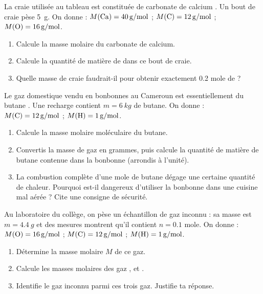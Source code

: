 \documentclass[11pt]{article}
\begin{document}
\begin{exercice}
La craie utilisée au tableau est constituée de carbonate de calcium . Un bout de craie pèse \SI{5}{g}.
On donne : $M(\ce{Ca}) = \SI{40}{g/mol}$ ; $M(\ce{C}) = \SI{12}{g/mol}$ ; $M(\ce{O}) = \SI{16}{g/mol}$.
\begin{enumerate}
\item Calcule la masse molaire du carbonate de calcium.
\item Calcule la quantité de matière de  dans ce bout de craie.
\item Quelle masse de craie faudrait-il pour obtenir exactement \num{0,2} mole de  ?
\end{enumerate}
\end{exercice}

\begin{exercice}
Le gaz domestique vendu en bonbonnes au Cameroun est essentiellement du butane . Une recharge contient $m = \SI{6}{kg}$ de butane.
On donne : $M(\ce{C}) = \SI{12}{g/mol}$ ; $M(\ce{H}) = \SI{1}{g/mol}$.
\begin{enumerate}
\item Calcule la masse molaire moléculaire du butane.
\item Convertis la masse de gaz en grammes, puis calcule la quantité de matière de butane contenue dans la bonbonne (arrondis à l'unité).
\item La combustion complète d'une mole de butane dégage une certaine quantité de chaleur. Pourquoi est-il dangereux d'utiliser la bonbonne dans une cuisine mal aérée ? Cite une consigne de sécurité.
\end{enumerate}
\end{exercice}

\begin{exercice}
Au laboratoire du collège, on pèse un échantillon de gaz inconnu : sa masse est $m = \SI{4,4}{g}$ et des mesures montrent qu'il contient $n = \num{0,1}$ mole.
On donne : $M(\ce{O}) = \SI{16}{g/mol}$ ; $M(\ce{C}) = \SI{12}{g/mol}$ ; $M(\ce{H}) = \SI{1}{g/mol}$.
\begin{enumerate}
\item Détermine la masse molaire $M$ de ce gaz.
\item Calcule les masses molaires des gaz ,  et .
\item Identifie le gaz inconnu parmi ces trois gaz. Justifie ta réponse.
\end{enumerate}
\end{exercice}
\end{document}
